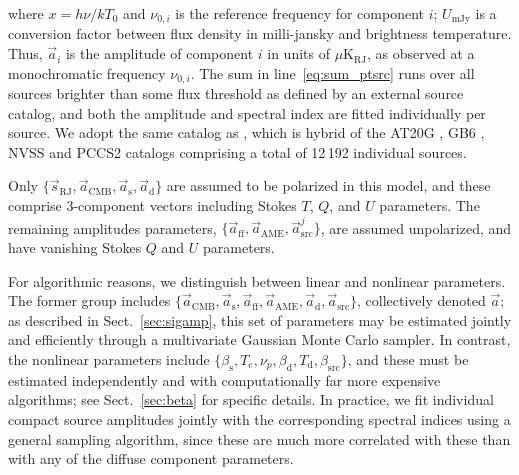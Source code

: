 \documentclass[onecolumn]{aa}
\renewcommand{\d}[0]{\vec{d}}
\newcommand{\s}[0]{\vec{s}}
\renewcommand{\a}[0]{\vec{a}}
\newcommand{\N}[0]{\tens{N}}
\begin{document}
where $x=h\nu/kT_0$ and $\nu_{0,i}$ is the reference frequency for
component $i$; $U_{\mathrm{mJy}}$ is a conversion factor between flux
density in milli-jansky and brightness temperature. Thus, $\a_i$ is
the amplitude of component $i$ in units of
$\mu\mathrm{K}_{\mathrm{RJ}}$, as observed at a monochromatic
frequency $\nu_{0,i}$.
The sum in line~\ref{eq:sum_ptsrc} runs over all sources brighter than
some flux threshold as defined by an external source catalog, and both
the amplitude and spectral index are fitted individually per
source. We adopt the same catalog as \citet{planck2016-l04}, which is
hybrid of the AT20G \citep{murphy2010}, GB6 \citep{gregory1996}, NVSS
\citep{condon1998} and PCCS2 \citep{planck2014-a35} catalogs
comprising a total of 12\,192 individual sources.


Only $\{\s_{\mathrm{RJ}}, \a_{\mathrm{CMB}}, \a_{\mathrm{s}},
\a_{\mathrm{d}}\}$ are assumed to be polarized in this model, and these
comprise 3-component vectors including Stokes $T$, $Q$, and $U$
parameters. The remaining amplitudes parameters, $\{\a_{\mathrm{ff}},
\a_{\mathrm{AME}}, \a^j_{\mathrm{src}}\}$, are assumed unpolarized, and have vanishing
Stokes $Q$ and $U$ parameters.

For algorithmic reasons, we distinguish between linear and nonlinear
parameters. The former group includes $\{\a_{\mathrm{CMB}},
\a_{\mathrm{s}}, \a_{\mathrm{ff}}, \a_{\mathrm{AME}}, \a_{\mathrm{d}},
\a_{\mathrm{src}}\}$, collectively denoted $\a$; as
described in Sect.~\ref{sec:sigamp}, this set of parameters may be
estimated jointly and efficiently through a multivariate Gaussian
Monte Carlo sampler. In contrast, the nonlinear parameters include
$\{\beta_{\mathrm{s}}, T_e, \nu_{p}, \beta_{\mathrm{d}},
T_{\mathrm{d}}, \beta_{\mathrm{src}}\}$, and these must be estimated
independently and with computationally far more expensive algorithms;
see Sect.~\ref{sec:beta} for specific details. In practice, we fit
individual compact source amplitudes jointly with the corresponding
spectral indices using a general sampling algorithm, since these are
much more correlated with these than with any of the diffuse component
parameters. 
\end{document}
